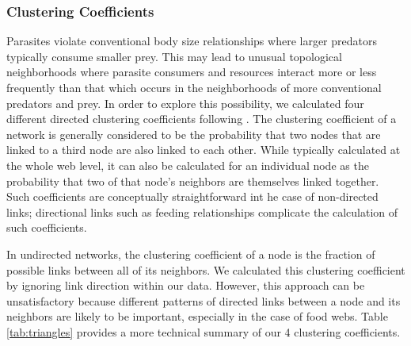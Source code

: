 \documentclass[../dissertation.tex]{subfiles}
\begin{document}
\subsubsection{Clustering Coefficients}
Parasites violate conventional body size relationships where larger predators
typically consume smaller prey. This may lead to unusual topological
neighborhoods where parasite consumers and resources interact more or less
frequently than that which occurs in the neighborhoods of more conventional
predators and prey. In order to explore this possibility, we calculated four
different directed clustering coefficients following \cite{Fagiolo2007}.
The clustering coefficient of a network is generally considered to be the
probability that two nodes that are linked to a third node are also linked to
each other. While typically calculated at the whole web level, it can also be
calculated for an individual node as the probability that two of that node's
neighbors are themselves linked together. Such coefficients are conceptually
straightforward int he case of non-directed links; directional links such as
feeding relationships complicate the calculation of such coefficients.


In undirected networks, the clustering coefficient of a node is the fraction of
possible links between all of its neighbors. We calculated this clustering
coefficient by ignoring link direction within our data. However, this approach
can be unsatisfactory because different patterns of directed links between a
node and its neighbors are likely to be important, especially in the case of
food webs. Table \ref{tab:triangles} provides a more technical summary of our 4
clustering coefficients.
\end{document}
